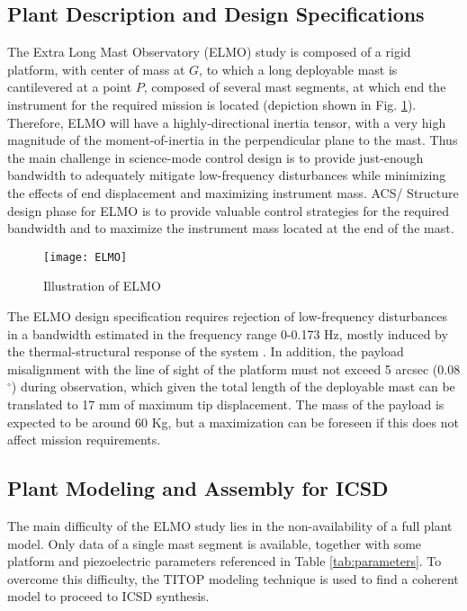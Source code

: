 \documentclass{ifacconf}
\begin{document}
\subsection{Plant Description and Design Specifications}

The Extra Long Mast Observatory (ELMO) study is composed of a rigid platform, with center of mass at $G$, to which a long deployable mast is cantilevered at a point $P$, composed of several mast segments, at which end the instrument for the required mission is located (depiction shown in  Fig. \ref{fig:elmo}). Therefore, ELMO will have a highly-directional inertia tensor, with a very high magnitude of the moment-of-inertia in the perpendicular plane to the mast. Thus the main challenge in science-mode control design is to provide just-enough bandwidth to adequately mitigate low-frequency disturbances while minimizing the effects of end displacement and maximizing instrument mass. ACS/ Structure design phase for ELMO is to provide valuable control strategies for the required bandwidth and to maximize the instrument mass located at the end of the mast.

\begin{figure} 
\centering
\texttt{[image: ELMO]}
\caption{Illustration of ELMO}
\label{fig:elmo}
\end{figure}

The ELMO design specification requires rejection of low-frequency disturbances in a bandwidth estimated in the frequency range 0-0.173 Hz, mostly induced by the thermal-structural response of the system \citep{Park2002_SC}. In addition, the payload misalignment with the line of sight of the platform must not exceed 5 arcsec (0.08$^\circ$) during observation, which given the total length of the deployable mast can be translated to 17 mm of maximum tip displacement. The mass of the payload is expected to be around 60 Kg, but a maximization can be foreseen if this does not affect mission requirements.


\subsection{Plant Modeling and Assembly for ICSD}

The main difficulty of the ELMO study lies in the non-availability of a full plant model. Only data of a single mast segment is available, together with some platform and piezoelectric parameters referenced in Table \ref{tab:parameters}. To overcome this difficulty, the TITOP modeling technique is used to find a coherent model to proceed to ICSD synthesis.
\end{document}
